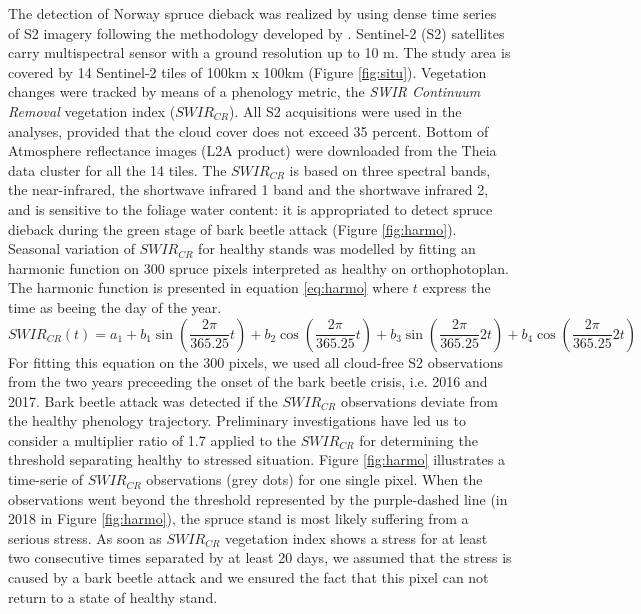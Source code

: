 \documentclass[3p,procedia]{elsarticle}
\begin{document}
The detection of Norway spruce dieback was realized by using dense time series of S2 imagery following the methodology developed by \cite{dutrieux_package_2021}.
Sentinel-2 (S2) satellites carry multispectral sensor with a ground resolution up to 10 m.
The study area is covered by 14 Sentinel-2 tiles of 100km x 100km (Figure \ref{fig:situ}).  
Vegetation changes were tracked by means of a phenology metric, the \textit{SWIR Continuum Removal} vegetation index ($SWIR_{CR}$).
All S2 acquisitions were used in the analyses, provided that the cloud cover does not exceed 35 percent. 
Bottom of Atmosphere reflectance images (L2A product) were downloaded from the Theia data cluster \citep{theia_team} for all the 14 tiles.
The $SWIR_{CR}$ is based on three spectral bands, the near-infrared, the shortwave infrared 1 band and the shortwave infrared 2, and is sensitive to the foliage water content: it is appropriated to detect spruce dieback during the green stage of bark beetle attack (Figure \ref{fig:harmo}).
Seasonal variation of $SWIR_{CR}$ for healthy stands was modelled by fitting an harmonic function on 300 spruce pixels interpreted as healthy on orthophotoplan. The harmonic function is presented in equation \ref{eq:harmo} where $t$ express the time as beeing the day of the year.
\begin{equation}\label{eq:harmo}
SWIR_{CR}(t) =   a_{1} + b_{1} \sin(\dfrac{2\pi}{365.25}t)+ b_{2} \cos(\dfrac{2\pi}{365.25}t)+ b_{3} \sin(\dfrac{2\pi}{365.25}2t)+ b_{4} \cos(\dfrac{2\pi}{365.25}2t)
\end{equation} 
For fitting this equation on the 300 pixels, we used all cloud-free S2 observations from the two years preceeding the onset of the bark beetle crisis, i.e. 2016 and 2017.
Bark beetle attack was detected if the $SWIR_{CR}$ observations deviate from the healthy phenology trajectory. 
Preliminary investigations have led us to consider a multiplier ratio of 1.7 applied to the $SWIR_{CR}$ for determining the threshold separating healthy to stressed situation.
Figure \ref{fig:harmo} illustrates a time-serie of $SWIR_{CR}$ observations (grey dots) for one single pixel. 
When the observations went beyond the threshold represented by the purple-dashed line (in 2018 in Figure \ref{fig:harmo}), the spruce stand is most likely suffering from a serious stress.
As soon as $SWIR_{CR}$ vegetation index shows a stress for at least two consecutive times separated by at least 20 days, we assumed that the stress is caused by a bark beetle attack and we ensured the fact that this pixel can not return to a state of healthy stand.
\end{document}
